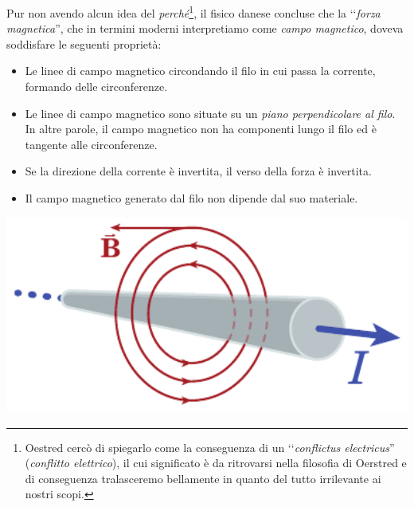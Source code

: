 Pur non avendo alcun idea del \textit{perché}\footnote{Oestred cercò di spiegarlo come la conseguenza di un ‘‘\textit{conflictus electricus}'' (\textit{conflitto elettrico}), il cui significato è da ritrovarsi nella filosofia di Oerstred e di conseguenza tralasceremo bellamente in quanto del tutto irrilevante ai nostri scopi.}, il fisico danese concluse che la ‘‘\textit{forza magnetica}'', che in termini moderni interpretiamo come \textit{campo magnetico}, doveva soddisfare le seguenti proprietà:\\
\begin{minipage}{0.69\textwidth}
	\begin{itemize}
		\item Le linee di campo magnetico circondando il filo in cui passa la corrente, formando delle circonferenze.
		\item Le linee di campo magnetico sono situate su un \textit{piano perpendicolare al filo}. In altre parole, il campo magnetico non ha componenti lungo il filo ed è tangente alle circonferenze.
		\item Se la direzione della corrente è invertita, il verso della forza è invertita.
		\item Il campo magnetico generato dal filo non dipende dal suo materiale.
	\end{itemize}
\end{minipage}\hspace{5pt}
\begin{minipage}{0.3\textwidth}
	\begin{center}
		\includegraphics[width=1\textwidth]{images/chp7/chp7oersted2.pdf}
	\end{center}
\end{minipage}
